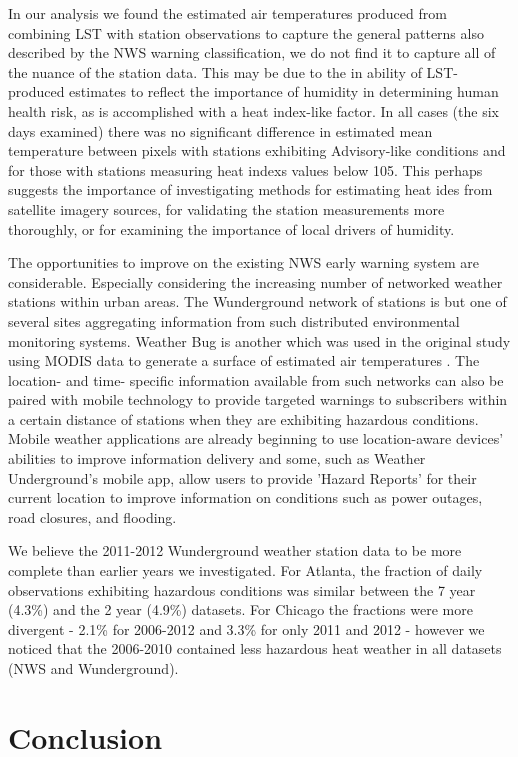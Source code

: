 \documentclass{ametsoc}
\begin{document}
In our analysis we found the estimated air temperatures produced from combining LST with station observations to capture the general patterns also described by the NWS warning classification, we do not find it to capture all of the nuance of the station data. This may be due to the in ability of LST-produced estimates to reflect the importance of humidity in determining human health risk, as is accomplished with a heat index-like factor. In all cases (the six days examined) there was no significant difference in estimated mean temperature between pixels with stations exhibiting Advisory-like conditions and for those with stations measuring heat indexs values below 105. This perhaps suggests the importance of investigating methods for estimating heat ides from satellite imagery sources, for validating the station measurements more thoroughly, or for examining the importance of local drivers of humidity.

The opportunities to improve on the existing NWS early warning system are considerable. Especially considering the increasing number of networked weather stations within urban areas. The Wunderground network of stations is but one of several sites aggregating information from such distributed environmental monitoring systems. Weather Bug is another which was used in the original study using MODIS data to generate a surface of estimated air temperatures \cite{kloog2012}. The location- and time- specific information available from such networks can also be paired with mobile technology to provide targeted warnings to subscribers within a certain distance of stations when they are exhibiting hazardous conditions. Mobile weather applications are already beginning to use location-aware devices' abilities to improve information delivery and some, such as Weather Underground's mobile app, allow users to provide 'Hazard Reports' for their current location to improve information on conditions such as power outages, road closures, and flooding. 

We believe the 2011-2012 Wunderground weather station data to be more complete than earlier years we investigated. For Atlanta, the fraction of daily observations exhibiting hazardous conditions was similar between the 7 year (4.3\%) and the 2 year (4.9\%)  datasets. For Chicago the fractions were more divergent - 2.1\% for 2006-2012 and 3.3\% for only 2011 and 2012 - however we noticed that the 2006-2010 contained less hazardous heat weather in all datasets (NWS and Wunderground).

\section{Conclusion}\label{section:conclusion}
\end{document}
